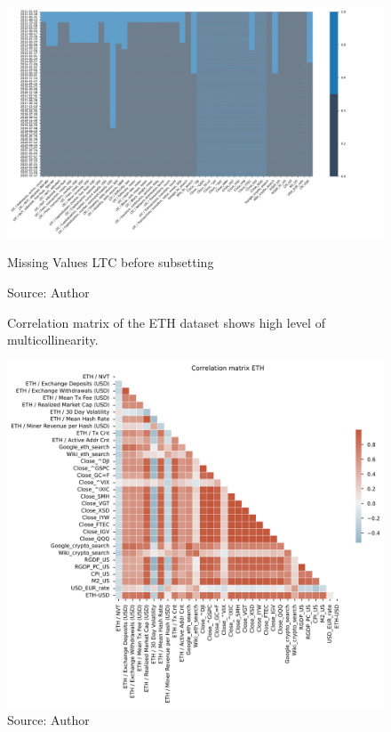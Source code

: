 \begin{figure}[!htbp]
    \centering
    \includegraphics[width=1.1\linewidth,height=0.9\textheight,keepaspectratio]{Figures/LTC_missing_1.png}
    \caption{Missing Values LTC before subsetting}
    \label{fig:ltc_missing_1}
    \caption*{Source: Author}
\end{figure}

\begin{figure}[!h]
    \centering
    \caption{Correlation matrix of the ETH dataset shows high level of 
    multicollinearity.}
    \includegraphics[width=1\textwidth]{Figures/Corr_eth.png}
    \caption*{Source: Author}
    \label{fig:Corr_eth}
\end{figure}


